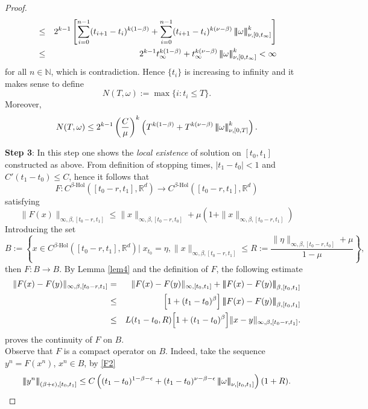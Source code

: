 \documentclass[graybox]{svmult}
\newcommand{\R}{\ensuremath{\mathbb{R}}}
\newcommand{\N}{\ensuremath{\mathbb{N}}}
\newcommand{\ltn}{\ensuremath{\left| \! \left| \! \left|}}
\newcommand{\rtn}{\ensuremath{\right| \! \right| \! \right|}}
\begin{document}
\begin{proof}
\begin{eqnarray*}
		&\leq &  2^{k-1} \left[ \sum_{i=0}^{n-1}(t_{i+1}-t_i)^{k(1-\beta)} + \sum_{i=0}^{n-1}(t_{i+1}-t_i)^{k(\nu-\beta)} \ltn \omega\rtn^k_{\nu,[0,t_\infty]}\right]\\
		&\leq &  2^{k-1} t_\infty^{k(1-\beta)} + t_\infty^{k(\nu-\beta)} \ltn \omega\rtn^k_{\nu,[0,t_\infty]}< \infty
	\end{eqnarray*}
	for all $n\in \N$, which is contradiction. Hence $\{t_i\}$ is increasing to infinity and it makes sense to define 
	\[
	N(T,\omega) := \max \{i: t_i \leq T\}.
	\]
	Moreover,
	\begin{eqnarray}\label{NT}
	N(T,\omega)\leq 2^{k-1}\left(\frac{C}{\mu}\right)^k \left( T^{k(1-\beta)} + T^{k(\nu-\beta)} \ltn \omega\rtn^k_{\nu,[0,T]}\right).
	\end{eqnarray}
	
	{\bf {Step 3}}: In this step one shows the {\em local existence} of solution on $[t_0,t_1]$ constructed as above. From definition of stopping times, $|t_1-t_0|<1$ and  $C'(t_1-t_0)\leq C$, hence it follows that
	\[
	F: C^{\beta\text{-Hol}}([t_0-r,t_1],\R^d)\rightarrow C^{\beta\text{-Hol}}([t_0-r,t_1],\R^d)
	\]
	satisfying
	\begin{equation}\label{solutionmap}
	\| F(x)\|_{\infty,\beta,[t_0-r,t_1]}\leq \| x\|_{\infty,\beta,[t_0-r,t_0]} + \mu (1+\|x\|_{\infty,\beta,[t_0-r,t_1]})
	\end{equation}
	Introducing the set 
	\[
	B:= \left\{x\in C^{\beta\text{-Hol}}([t_0-r,t_1],\R^d)|\;x_{t_0} = \eta, \|x\|_{\infty,\beta,[t_0-r,t_1]}\leq R:=\frac{ \| \eta\|_{\infty,\beta,[t_0-r,t_0]}+\mu}{1-\mu} \right\},
	\]
	then $F:B\rightarrow B$. %
	By Lemma \ref{lem4} and the definition of $F$, the following estimate
	\begin{eqnarray*}
		\|F(x)-F(y)\|_{\infty,\beta,[t_0-r,t_1]}&=&\|F(x)-F(y)\|_{\infty,[t_0,t_1]}+\ltn F(x)-F(y)\rtn_{\beta,[t_0,t_1]}\\
		&\leq& \Big[1+(t_1-t_0)^\beta\Big]\ltn F(x)-F(y)\rtn_{\beta,[t_0,t_1]}\\
		&\leq& L(t_1-t_0,R)\Big[1+(t_1-t_0)^\beta\Big]\|x-y\|_{\infty,\beta,[t_0-r,t_1]}.
	\end{eqnarray*}
	proves the continuity of $F$ on $B$.\\
	Observe that $F$ is a compact operator on $B$. Indeed, take the sequence $y^n=F(x^n)$, $x^n\in B$, by \eqref{F2}     
	$$\ltn y^n\rtn_{(\beta+\epsilon),[t_0,t_1]}\leq C \left((t_1-t_0)^{1-\beta-\epsilon} + (t_1-t_0)^{\nu-\beta-\epsilon} \ltn \omega\rtn_{\nu,[t_0,t_1]} \right)(1+R).$$

\end{proof}
\end{document}
